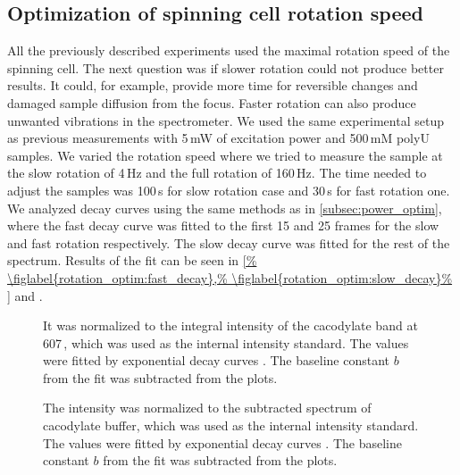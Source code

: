\subsection{Optimization of spinning cell rotation speed}

All the previously described experiments used the maximal rotation speed of
the spinning cell.
The next question was if slower rotation could not produce better results.
It could, for example, provide more time for reversible changes and damaged
sample diffusion from the focus.
Faster rotation can also produce unwanted vibrations in the spectrometer.
We used the same experimental setup as previous measurements with 5\,mW of
excitation power and 500\,mM polyU samples.
We varied the rotation speed where we tried to measure the sample at the slow
rotation of 4\,Hz and the full rotation of 160\,Hz.
The time needed to adjust the samples was 100\,s for slow rotation case and
30\,s for fast rotation one.
We analyzed decay curves using the same methods as in
\cref{subsec:power_optim},
where the fast decay curve was fitted to the first 15 and 25 frames for the
slow and fast rotation respectively.
The slow decay curve was fitted for the rest of the spectrum.
Results of the fit can be seen in
\cref{%
	\figlabel{rotation_optim:fast_decay},%
	\figlabel{rotation_optim:slow_decay}%
}
and
.

\begin{figure}
	\centering
	
	\caption[%
		Decrease of the integral intensity of the polyU band at 1231\,\icm{} for
		different sample cell rotation speeds in raw spectra.%
	]{%
		It was normalized to the integral intensity of the cacodylate band at
		607\,\icm{}, which was used as the internal intensity standard.
		The values were fitted by exponential decay curves
		.
		The baseline constant $b$ from the fit was subtracted from the plots.
	}
	\label{\figlabel{rotation_optim:fast_decay}}
\end{figure}

\begin{figure}
	\centering
	
	\caption[%
		Decrease of the integral intensity of the polyU band at 1231\,\icm{}
		for different sample cell rotation speeds in background-corrected spectra.%
	]{%
		The intensity was normalized to the subtracted spectrum of cacodylate
		buffer, which was used as the internal intensity standard.
		The values were fitted by exponential decay curves
		.
		The baseline constant $b$ from the fit was subtracted from the plots.
	}
	\label{\figlabel{rotation_optim:slow_decay}}
\end{figure}

